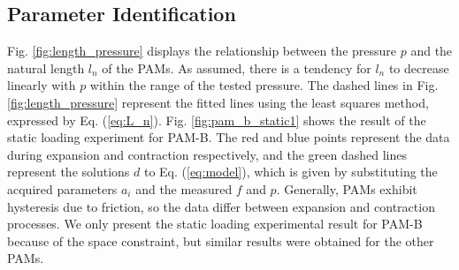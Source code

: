 \subsection{Parameter Identification}
Fig. \ref{fig:length_pressure} displays the relationship between the pressure $p$ and the natural length $l_n$ of the PAMs. As assumed, there is a tendency for $l_n$ to decrease linearly with $p$ within the range of the tested pressure. The dashed lines in Fig. \ref{fig:length_pressure} represent the fitted lines using the least squares method, expressed by Eq. (\ref{eq:L_n}).
Fig. \ref{fig:pam_b_static1} shows the result of the static loading experiment for PAM-B. The red and blue points represent the data during expansion and contraction respectively, and the green dashed lines represent the solutions $d$ to Eq. (\ref{eq:model}), which is given by substituting the acquired parameters $a_i$ and the measured $f$ and $p$.
Generally, PAMs exhibit hysteresis due to friction, so the data differ between expansion and contraction processes. We only present the static loading experimental result for PAM-B because of the space constraint, but similar results were obtained for the other PAMs.

